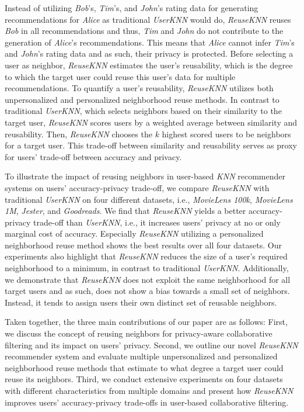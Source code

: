 \documentclass[manuscript,review,anonymous]{acmart}
\begin{document}
Instead of utilizing \emph{Bob}'s, \emph{Tim}'s, and \emph{John}'s rating data for generating recommendations for \emph{Alice} as traditional \emph{UserKNN} would do, \emph{ReuseKNN} reuses \emph{Bob} in all recommendations and thus, \emph{Tim} and \emph{John} do not contribute to the generation of \emph{Alice}'s recommendations.
This means that \emph{Alice} cannot infer \emph{Tim}'s and \emph{John}'s rating data and as such, their privacy is protected.
Before selecting a user as neighbor, \emph{ReuseKNN} estimates the user's reusability, which is the degree to which the target user could reuse this user's data for multiple recommendations. 
To quantify a user's reusability, \emph{ReuseKNN} utilizes both unpersonalized and personalized neighborhood reuse methods.
In contrast to traditional \emph{UserKNN}, which selects neighbors based on their similarity to the target user, \emph{ReuseKNN} scores users by a weighted average between similarity and reusability.
Then, \emph{ReuseKNN} chooses the $k$ highest scored users to be neighbors for a target user. 
This trade-off between similarity and reusability serves as proxy for users' trade-off between accuracy and privacy.

To illustrate the impact of reusing neighbors in user-based \emph{KNN} recommender systems on users' accuracy-privacy trade-off, we compare \emph{ReuseKNN} with traditional \emph{UserKNN} on four different datasets, i.e., \emph{MovieLens 100k}, \emph{MovieLens 1M}, \emph{Jester}, and \emph{Goodreads}. 
We find that \emph{ReuseKNN} yields a better accuracy-privacy trade-off than \emph{UserKNN}, i.e., it increases users' privacy at no or only marginal cost of accuracy.
Especially \emph{ReuseKNN} utilizing a personalized neighborhood reuse method shows the best results over all four datasets.
Our experiments also highlight that \emph{ReuseKNN} reduces the size of a user's required neighborhood to a minimum, in contrast to traditional \emph{UserKNN}.
Additionally, we demonstrate that \emph{ReuseKNN} does not exploit the same neighborhood for all target users and as such, does not show a bias towards a small set of neighbors.
Instead, it tends to assign users their own distinct set of reusable neighbors.

Taken together, the three main contributions of our paper are as follows: 
First, we discuss the concept of reusing neighbors for privacy-aware collaborative filtering and its impact on users' privacy.
Second, we outline our novel \emph{ReuseKNN} recommender system and evaluate multiple unpersonalized and personalized neighborhood reuse methods that estimate to what degree a target user could reuse its neighbors.
Third, we conduct extensive experiments on four datasets with different characteristics from multiple domains and present how \emph{ReuseKNN} improves users' accuracy-privacy trade-offs in user-based collaborative filtering. 
\end{document}
